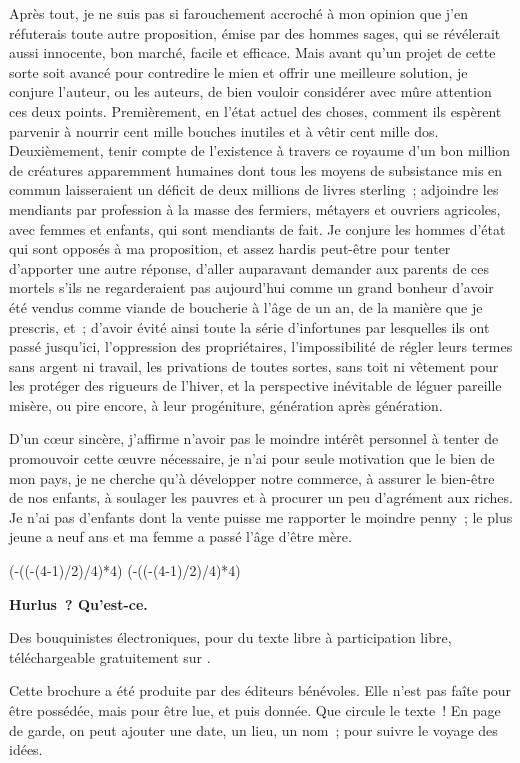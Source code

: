 \documentclass[french,twoside]{book} %
\def\truncdiv#1#2{((#1-(#2-1)/2)/#2)}
\def\moduloop#1#2{(#1-\truncdiv{#1}{#2}*#2)}
\def\modulo#1#2{\number\numexpr\moduloop{#1}{#2}\relax}
\begin{document}
Après tout, je ne suis pas si farouchement accroché à mon opinion que j’en réfuterais toute autre proposition, émise par des hommes sages, qui se révélerait aussi innocente, bon marché, facile et efficace. Mais avant qu’un projet de cette sorte soit avancé pour contredire le mien et offrir une meilleure solution, je conjure l’auteur, ou les auteurs, de bien vouloir considérer avec mûre attention ces deux points. Premièrement, en l’état actuel des choses, comment ils espèrent parvenir à nourrir cent mille bouches inutiles et à vêtir cent mille dos. Deuxièmement, tenir compte de l’existence à travers ce royaume d’un bon million de créatures apparemment humaines dont tous les moyens de subsistance mis en commun laisseraient un déficit de deux millions de livres sterling ; adjoindre les mendiants par profession à la masse des fermiers, métayers et ouvriers agricoles, avec femmes et enfants, qui sont mendiants de fait. Je conjure les hommes d’état qui sont opposés à ma proposition, et assez hardis peut-être pour tenter d’apporter une autre réponse, d’aller auparavant demander aux parents de ces mortels s’ils ne regarderaient pas aujourd’hui comme un grand bonheur d’avoir été vendus comme viande de boucherie à l’âge de un an, de la manière que je prescris, et ; d’avoir évité ainsi toute la série d’infortunes par lesquelles ils ont passé jusqu’ici, l’oppression des propriétaires, l’impossibilité de régler leurs termes sans argent ni travail, les privations de toutes sortes, sans toit ni vêtement pour les protéger des rigueurs de l’hiver, et la perspective inévitable de léguer pareille misère, ou pire encore, à leur progéniture, génération après génération.\par
D’un cœur sincère, j’affirme n’avoir pas le moindre intérêt personnel à tenter de promouvoir cette œuvre nécessaire, je n’ai pour seule motivation que le bien de mon pays, je ne cherche qu’à développer notre commerce, à assurer le bien-être de nos enfants, à soulager les pauvres et à procurer un peu d’agrément aux riches. Je n’ai pas d’enfants dont la vente puisse me rapporter le moindre penny ; le plus jeune a neuf ans et ma femme a passé l’âge d’être mère.
 


\ifbooklet
  \pagestyle{empty}
  \clearpage
  \ifnum\modulo{\value{page}}{4}=0 \hbox{}\newpage\hbox{}\newpage\fi
  \ifnum\modulo{\value{page}}{4}=1 \hbox{}\newpage\hbox{}\newpage\fi


  \hbox{}\newpage
  \ifodd\value{page}\hbox{}\newpage\fi
  {\centering\color{rubric}\bfseries\noindent\large
    Hurlus ? Qu’est-ce.\par
    \bigskip
  }
  \noindent Des bouquinistes électroniques, pour du texte libre à participation libre,
  téléchargeable gratuitement sur \href{https://hurlus.fr}{}.\par
  \bigskip
  \noindent Cette brochure a été produite par des éditeurs bénévoles.
  Elle n’est pas faîte pour être possédée, mais pour être lue, et puis donnée.
  Que circule le texte !
  En page de garde, on peut ajouter une date, un lieu, un nom ; pour suivre le voyage des idées.
  \par
\end{document}
